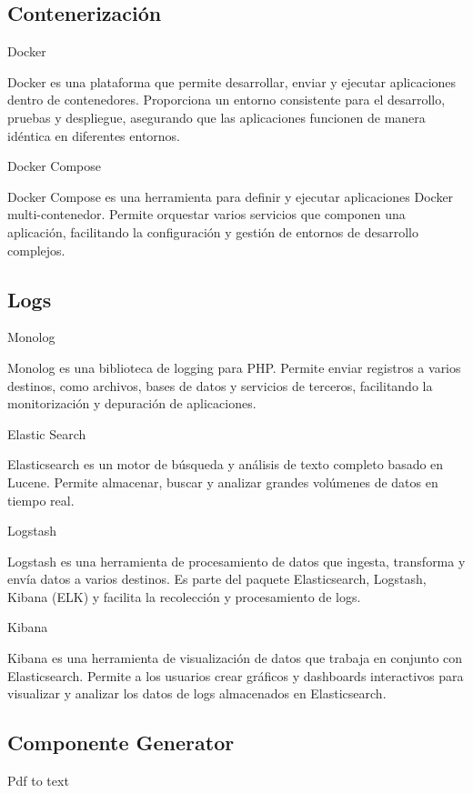 \subsection*{Contenerización}

Docker

Docker es una plataforma que permite desarrollar, enviar y ejecutar aplicaciones dentro de
contenedores.
Proporciona un entorno consistente para el desarrollo, pruebas y despliegue, asegurando que las aplicaciones funcionen
de manera idéntica en diferentes entornos.

Docker Compose

Docker Compose es una herramienta para definir y ejecutar aplicaciones Docker multi-contenedor.
Permite orquestar varios servicios que componen una aplicación, facilitando
la configuración y gestión de entornos de desarrollo complejos.

\subsection*{Logs}

Monolog

Monolog es una biblioteca de logging para PHP. Permite enviar registros a varios destinos, como archivos, bases de datos
y servicios de terceros, facilitando la monitorización y depuración de aplicaciones.

Elastic Search

Elasticsearch es un motor de búsqueda y análisis de texto completo basado en Lucene.
Permite almacenar, buscar y analizar grandes volúmenes de datos en tiempo real.

Logstash

Logstash es una herramienta de procesamiento de datos que ingesta, transforma y envía datos a varios
destinos.
Es parte del paquete Elasticsearch, Logstash, Kibana (ELK) y facilita la recolección y procesamiento de logs.

Kibana

Kibana es una herramienta de visualización de datos que trabaja en conjunto con Elasticsearch.
Permite a los usuarios crear gráficos y dashboards interactivos para visualizar y analizar los datos de logs almacenados
en Elasticsearch.

\subsection*{Componente Generator}

Pdf to text

